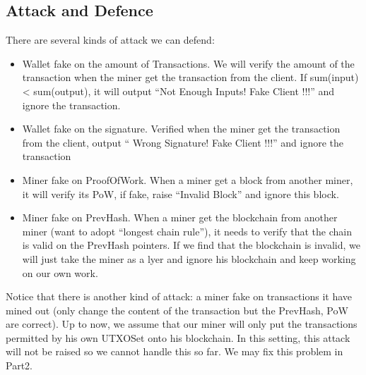 \documentclass{article}
\begin{document}
\begin{spacing}{1.0}
		\section{Attack and Defence}
		There are several kinds of attack we can defend:
		\begin{itemize}
			\item Wallet fake on the amount of Transactions. We will verify the amount of the transaction when the miner get the transaction from the client. If sum(input) < sum(output), it will output ``Not Enough Inputs! Fake Client !!!'' and ignore the transaction.
			\item Wallet fake on the signature. Verified when the miner get the transaction from the client, output `` Wrong Signature! Fake Client !!!'' and ignore the transaction
			\item Miner fake on ProofOfWork. When a miner get a block from another miner, it will verify its PoW, if fake, raise ``Invalid Block'' and ignore this block.
			\item Miner fake on PrevHash. When a miner get the blockchain from another miner (want to adopt ``longest chain rule''), it needs to verify that the chain is valid 
			on the PrevHash pointers. If we find that the blockchain is invalid, we will just take the miner as a lyer and ignore his blockchain and keep working on our own work.
		\end{itemize}
		Notice that there is another kind of attack: a miner fake on transactions it have mined out (only change the content of the transaction but the PrevHash, PoW are correct). Up to now, we assume that 
		our miner will only put the transactions permitted by his own UTXOSet onto his blockchain. In this setting, this attack will not be raised so we cannot handle this so far. We may fix this problem in Part2. 

\end{spacing}
\end{document}
